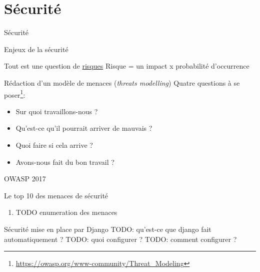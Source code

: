 \section{Sécurité}

\begin{frame}{Sécurité}  
\end{frame}

\begin{frame}{Enjeux de la sécurité}

  \begin{block}{Tout est une question de \underline{risques}}
    Risque = un impact x probabilité d'occurrence
  \end{block}

  \begin{block}{Rédaction d'un modèle de menaces (\textit{threats modelling})}
    Quatre questions à se poser\footnote{\url{https://owasp.org/www-community/Threat_Modeling}}:
    \begin{itemize}
    \item Sur quoi travaillons-nous ?
    \item Qu'est-ce qu'il pourrait arriver de mauvais ?
    \item Quoi faire si cela arrive ?
    \item Avons-nous fait du bon travail ?
    \end{itemize}
  \end{block}
\end{frame}

\begin{frame}{OWASP 2017}
  \begin{block}{Le top 10 des menaces de sécurité}
    \begin{enumerate}
    \item TODO enumeration des menaces
    \end{enumerate}
  \end{block}
\end{frame}

\begin{frame}{Sécurité mise en place par Django}
  TODO: qu'est-ce que django fait automatiquement ?
  \newline
  TODO: quoi configurer ?
  \newline
  TODO: comment configurer ?
\end{frame}

